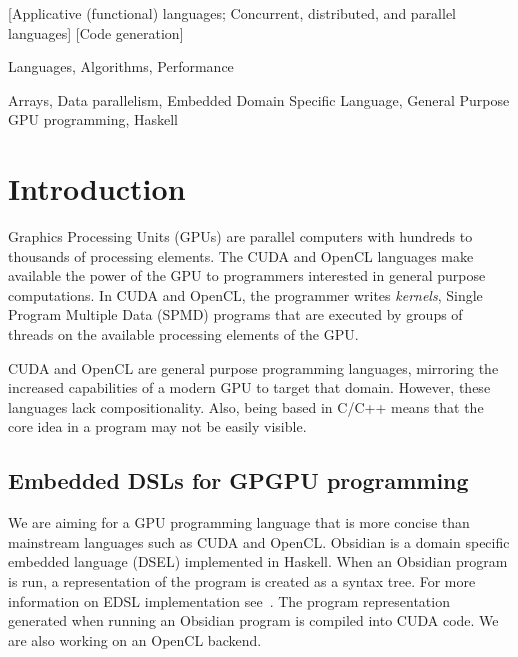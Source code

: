 \documentclass[]{sigplanconf}
\begin{document}
[Applicative (functional) languages; Concurrent, distributed, and parallel languages]
[Code generation]



\terms
Languages, Algorithms, Performance

\keywords
Arrays, Data parallelism, Embedded Domain Specific Language, General Purpose GPU programming, Haskell

%
\section{Introduction} 

%


Graphics Processing Units (GPUs) are parallel computers with hundreds 
to thousands of processing elements. The CUDA and OpenCL languages  
make available the power of the GPU to programmers interested in general 
purpose computations. In CUDA and OpenCL, the programmer writes {\em kernels}, 
Single Program Multiple Data (SPMD) programs that are executed by groups 
of threads on the available processing elements of the GPU.  

CUDA and OpenCL are general purpose programming languages, mirroring the 
increased capabilities of a modern GPU to target that domain. However, these 
languages lack compositionality. 
Also, being based in C/C++ means that the core idea in a program may
not be easily visible.  

\subsection{Embedded DSLs for GPGPU programming} 
We are aiming for a GPU programming language that is more
concise than mainstream
languages such as CUDA and OpenCL. 
Obsidian is a
domain specific embedded language (DSEL) implemented in Haskell.
When an Obsidian program is run, a representation of the program is created 
as a syntax tree. For more information on EDSL implementation see~\cite{COMPILEEDSL}.
The program representation generated when running an Obsidian program 
is compiled into CUDA code. We are also working on an OpenCL backend.
\end{document}
